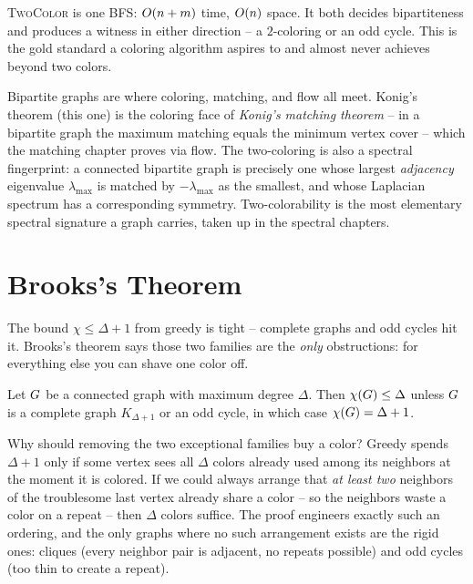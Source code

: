 \begin{complexitybox}
\textsc{TwoColor} is one BFS: $O(n+m)$ time, $O(n)$ space. It both decides
bipartiteness and produces a witness in either direction -- a $2$-coloring or an
odd cycle. This is the gold standard a coloring algorithm aspires to and almost
never achieves beyond two colors.
\end{complexitybox}

\begin{connectionbox}
Bipartite graphs are where coloring, matching, and flow all meet. Konig's theorem
(this one) is the coloring face of \emph{Konig's matching theorem} -- in a
bipartite graph the maximum matching equals the minimum vertex cover -- which the
matching chapter proves via flow. The two-coloring is also a spectral fingerprint:
a connected bipartite graph is precisely one whose largest \emph{adjacency}
eigenvalue $\lambda_{\max}$ is matched by $-\lambda_{\max}$ as the smallest, and
whose Laplacian spectrum has a corresponding symmetry. Two-colorability is the most
elementary spectral signature a graph carries, taken up in the spectral chapters.
\end{connectionbox}

\section{Brooks's Theorem}
\label{ch28:brooks}

The bound $\chi\le\Delta+1$ from greedy is tight -- complete graphs and odd cycles
hit it. Brooks's theorem says those two families are the \emph{only} obstructions:
for everything else you can shave one color off.

\begin{theorem}[Brooks, 1941]
\label{ch28:thm-brooks}
Let $G$ be a connected graph with maximum degree $\Delta$. Then
$\chi(G)\le\Delta$ unless $G$ is a complete graph $K_{\Delta+1}$ or an odd
cycle, in which case $\chi(G)=\Delta+1$.
\end{theorem}

\begin{intuitionbox}
Why should removing the two exceptional families buy a color? Greedy spends
$\Delta+1$ only if some vertex sees all $\Delta$ colors already used among its
neighbors at the moment it is colored. If we could always arrange that \emph{at
least two} neighbors of the troublesome last vertex already share a color -- so the
neighbors waste a color on a repeat -- then $\Delta$ colors suffice. The proof
engineers exactly such an ordering, and the only graphs where no such arrangement
exists are the rigid ones: cliques (every neighbor pair is adjacent, no repeats
possible) and odd cycles (too thin to create a repeat).
\end{intuitionbox}

